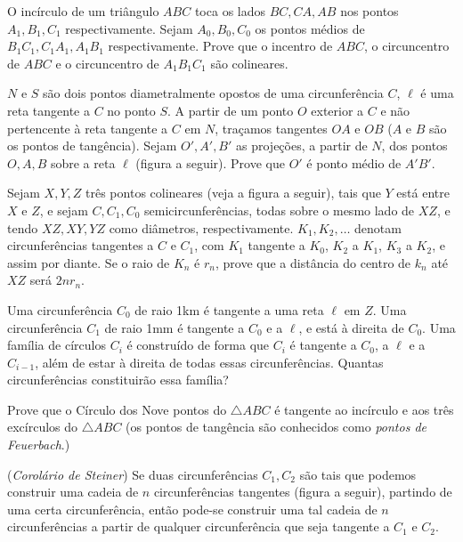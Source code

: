 \begin{questao}
  O incírculo de um triângulo $ABC$ toca os lados
  $BC,CA,AB$ nos pontos $A_1,B_1,C_1$ respectivamente. Sejam
  $A_0,B_0,C_0$ os pontos médios de $B_1C_1,C_1A_1,A_1B_1$
  respectivamente. Prove que o incentro de $ABC$, o circuncentro de
  $ABC$ e o circuncentro de $A_1B_1C_1$ são colineares.
\end{questao}

\begin{questao}
  $N$ e $S$ são dois pontos diametralmente opostos de
  uma circunferência $C$, $\ell$ é uma reta tangente a $C$ no
  ponto $S$. A partir de um ponto $O$ exterior a $C$ e não
  pertencente à reta tangente a $C$ em $N$, traçamos tangentes
  $OA$ e $OB$ ($A$ e $B$ são os pontos de tangência). Sejam
  $O', A', B'$ as projeções, a partir de $N$,
  dos pontos $O,A,B$ sobre a reta $\ell$ (figura a seguir). Prove
  que $O'$ é ponto médio de $A' B'$.
\end{questao}

\begin{questao}
  Sejam $X,Y,Z$ três pontos colineares (veja a figura a
  seguir), tais que $Y$ está entre $X$ e $Z$, e sejam
  $C,C_1,C_0$ semicircunferências, todas sobre o mesmo lado de
  $XZ$, e tendo $XZ,XY,YZ$ como diâmetros,
  respectivamente. $K_1,K_2, \ldots$ denotam circunferências
  tangentes a $C$ e $C_1$, com $K_1$ tangente a $K_0$, $K_2$
  a $K_1$, $K_3$ a $K_2$, e assim por diante. Se o raio de
  $K_n$ é $r_n$, prove que a distância do centro de $k_n$ até
  $XZ$ será $2nr_n$.
\end{questao}

\begin{questao}
  Uma circunferência $C_0$ de raio 1km é tangente a uma
  reta $\ell$ em $Z$. Uma circunferência $C_1$ de raio 1mm é
  tangente a $C_0$ e a $\ell$, e está à direita de $C_0$. Uma
  família de círculos $C_i$ é construído de forma que $C_i$ é
  tangente a $C_0$, a $\ell$ e a $C_{i-1}$, além de estar à
  direita de todas essas circunferências. Quantas circunferências
  constituirão essa família?
\end{questao}

\begin{questao}
  Prove que o Círculo dos Nove pontos do $\triangle ABC$ é
  tangente ao incírculo e aos três excírculos do $\triangle ABC$ (os
  pontos de tangência são conhecidos como {\it pontos de Feuerbach}.)
\end{questao}

\begin{questao}
  ({\it Corolário de Steiner}) Se duas circunferências
  $C_1,C_2$ são tais que podemos construir uma cadeia de $n$
  circunferências tangentes (figura a seguir), partindo de uma certa
  circunferência, então pode-se construir uma tal cadeia de
  $n$ circunferências a partir de qualquer circunferência que seja
  tangente a $C_1$ e $C_2$.
\end{questao}

